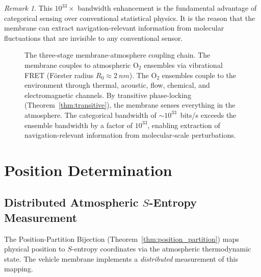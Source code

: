 \documentclass[12pt]{article}
\theoremstyle{definition}
\theoremstyle{remark}
\newtheorem{remark}[theorem]{Remark}
\begin{document}
\begin{remark}
This $10^{33}\times$ bandwidth enhancement is the fundamental advantage of categorical sensing over conventional statistical physics. It is the reason that the membrane can extract navigation-relevant information from molecular fluctuations that are invisible to any conventional sensor.
\end{remark}

\begin{figure}[H]
\centering
{}
\caption{The three-stage membrane-atmosphere coupling chain. The membrane couples to atmospheric $\mathrm{O}_2$ ensembles via vibrational FRET (F\"orster radius $R_0 \approx \SI{2}{nm}$). The $\mathrm{O}_2$ ensembles couple to the environment through thermal, acoustic, flow, chemical, and electromagnetic channels. By transitive phase-locking (Theorem~\ref{thm:transitive}), the membrane senses everything in the atmosphere. The categorical bandwidth of $\sim 10^{33}$~bits/s exceeds the ensemble bandwidth by a factor of $10^{33}$, enabling extraction of navigation-relevant information from molecular-scale perturbations.}
\label{fig:coupling_chain}
\end{figure}


\section{Position Determination}
\label{sec:position}

\subsection{Distributed Atmospheric $S$-Entropy Measurement}

The Position-Partition Bijection (Theorem~\ref{thm:position_partition}) maps physical position to $S$-entropy coordinates via the atmospheric thermodynamic state. The vehicle membrane implements a \emph{distributed} measurement of this mapping.
\end{document}
